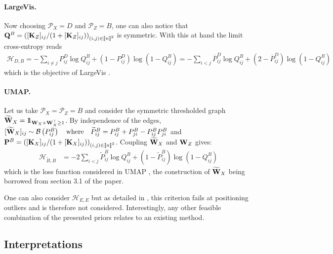 \paragraph{LargeVis.}
Now choosing $\mathcal{P}_{X} = D$ and $\mathcal{P}_{Z} = B$, one can also notice that $\mathbf{Q}^{B} = \left( [\mathbf{K}_Z]_{ij} / (1+[\mathbf{K}_Z]_{ij}) \right)_{(i,j) \in {[\![n]\!]}^2}$ is symmetric. With this at hand the limit cross-entropy reads
\begin{align*}
    \mathcal{H}_{D,B} = - \sum_{i \neq j} P^{D}_{ij} \log Q^{B}_{ij} + \left(1 - P^{D}_{ij} \right) \log\left(1-Q^{B}_{ij} \right)
    = - \sum_{i < j} \overline{P}^{D}_{ij} \log Q^{B}_{ij} + \left(2-\overline{P}^{D}_{ij}\right) \log (1- Q^{B}_{ij})
\end{align*}
which is the objective of LargeVis \cite{tang2016visualizing}.

\paragraph{UMAP.}
Let us take $\mathcal{P}_{X} = \mathcal{P}_{Z} = B$ and consider the symmetric thresholded graph $\widetilde{\mathbf{W}}_{X} = 1\!\!1_{\mathbf{W}_{X} + \mathbf{W}_X^\top \geq 1}$. By independence of the edges, $[\widetilde{\mathbf{W}}_{X}]_{ij} \sim \mathcal{B}\left(P^{B}_{ij} \right) \quad \text{where} \quad  \widetilde{P}^{B}_{ij} = P^{B}_{ij} + P^{B}_{ji} - P^{B}_{ij} P^{B}_{ji}$ and $\mathbf{P}^{B} = \left( [\mathbf{K}_X]_{ij} / (1+[\mathbf{K}_X]_{ij}) \right)_{(i,j) \in {[\![n]\!]}^2}$. Coupling $\widetilde{\mathbf{W}}_{X}$ and $\mathbf{W}_{Z}$ gives:
\begin{align*}
    \mathcal{H}_{\widetilde{B},B} &= -2 \sum_{i<j} \widetilde{P}_{ij}^{B} \log Q_{ij}^{B} + \left(1 - \widetilde{P}_{ij}^{B} \right) \log \left( 1 - Q_{ij}^{B} \right)
\end{align*}
which is the loss function considered in UMAP \cite{mcinnes2018umap}, the construction of $\widetilde{\mathbf{W}}_{X}$ being borrowed from section 3.1 of the paper.

\begin{remark}
One can also consider $\mathcal{H}_{E,E}$ but as detailed in \cite{maaten2008tSNE}, this criterion fails at positioning outliers and is therefore not considered. 
Interestingly, any other feasible combination of the presented priors relates to an existing method.
\end{remark}

\subsection{Interpretations}\label{sec:interpretations}

